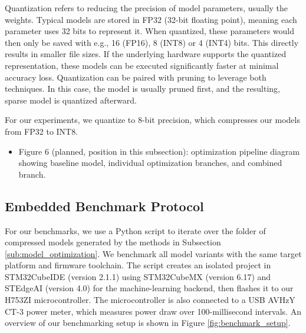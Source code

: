 \documentclass[final,3p,times]{elsarticle}
\begin{document}
Quantization refers to reducing the precision of model parameters, usually the weights. Typical models are stored in FP32 (32-bit floating point), meaning each parameter uses 32 bits to represent it. When quantized, these parameters would then only be saved with e.g., 16 (FP16), 8 (INT8) or 4 (INT4) bits. This directly results in smaller file sizes. If the underlying hardware supports the quantized representation, these models can be executed significantly faster at minimal accuracy loss. Quantization can be paired with pruning to leverage both techniques. In this case, the model is usually pruned first, and the resulting, sparse model is quantized afterward.

For our experiments, we quantize to 8-bit precision, which compresses our models from FP32 to INT8.

\begin{itemize}[leftmargin=*]


\item Figure 6 (planned, position in this subsection): optimization pipeline diagram showing baseline model, individual optimization branches, and combined branch.
\end{itemize}

\subsection{Embedded Benchmark Protocol}

For our benchmarks, we use a Python script to iterate over the folder of compressed models generated by the methods in Subsection \ref{sub:model_optimization}. We benchmark all model variants with the same target platform and firmware toolchain. The script creates an isolated project in STM32CubeIDE (version 2.1.1) using STM32CubeMX (version 6.17) and STEdgeAI (version 4.0) for the machine-learning backend, then flashes it to our H753ZI microcontroller. The microcontroller is also connected to a USB AVHzY CT-3 power meter, which measures power draw over 100-millisecond intervals. An overview of our benchmarking setup is shown in Figure \ref{fig:benchmark_setup}.
\end{document}
